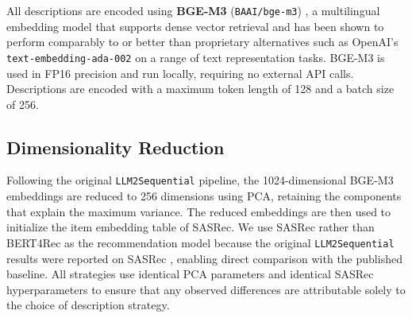 \documentclass[12pt,a4paper]{report}
\begin{document}
\justifying
All descriptions are encoded using \textbf{BGE-M3}
(\texttt{BAAI/bge-m3}) \citep{chen2024bge}, a multilingual embedding model that
supports dense vector retrieval and has been shown to perform comparably to or
better than proprietary alternatives such as OpenAI's \texttt{text-embedding-ada-002}
on a range of text representation tasks. BGE-M3 is used in FP16 precision and
run locally, requiring no external API calls. Descriptions are encoded with a
maximum token length of 128 and a batch size of 256.

\subsection*{Dimensionality Reduction}

\justifying
Following the original \texttt{LLM2Sequential} pipeline, the 1024-dimensional
BGE-M3 embeddings are reduced to 256 dimensions using PCA, retaining the
components that explain the maximum variance. The reduced embeddings are then
used to initialize the item embedding table of SASRec. We use SASRec rather
than BERT4Rec as the recommendation model because the original
\texttt{LLM2Sequential} results were reported on SASRec \citep{boz2025},
enabling direct comparison with the published baseline. All strategies use
identical PCA parameters and identical SASRec hyperparameters to ensure that
any observed differences are attributable solely to the choice of description
strategy.
\end{document}
